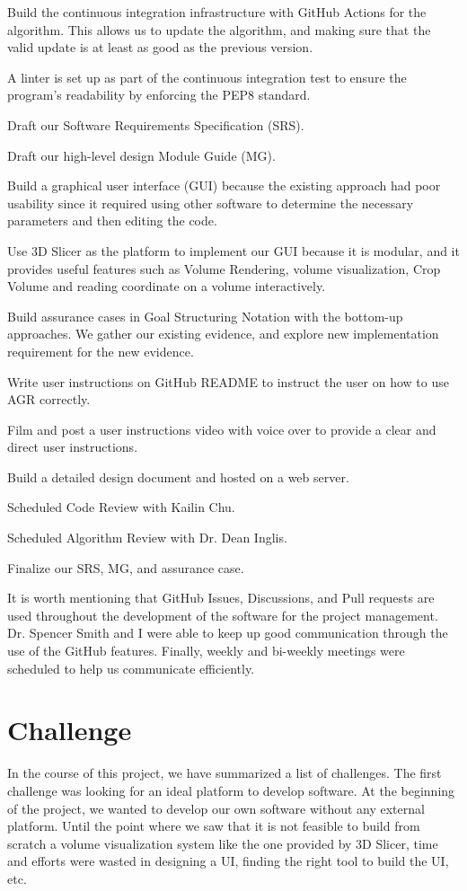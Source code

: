  \begin{myEnumerate}
\item Build the continuous integration infrastructure with GitHub Actions for the algorithm. This allows us to update the algorithm, and making sure that the valid update is at least as good as the previous version. 
\item A linter is set up as part of the continuous integration test to ensure the program's readability by enforcing the PEP8 standard.
\item Draft our Software Requirements Specification (SRS).
\item Draft our high-level design Module Guide (MG).
\item Build a graphical user interface (GUI) because the existing approach had poor usability since it required using other software to determine the necessary parameters and then editing the code.
\item Use 3D Slicer as the platform to implement our GUI because it is modular, and it provides useful features such as Volume Rendering, volume visualization, Crop Volume and reading coordinate on a volume interactively.
\item Build assurance cases in Goal Structuring Notation with the bottom-up approaches. We gather our existing evidence, and explore new implementation requirement for the new evidence.
\item Write user instructions on GitHub README to instruct the user on how to use AGR correctly.
\item Film and post a user instructions video with voice over to provide a clear and direct user instructions.
\item Build a detailed design document and hosted on a web server.
\item Scheduled Code Review with Kailin Chu.
\item Scheduled Algorithm Review with Dr. Dean Inglis.
\item Finalize our SRS, MG, and assurance case. 
\end{myEnumerate}

It is worth mentioning that GitHub Issues, Discussions, and Pull requests are used throughout the development of the software for the project management. Dr. Spencer Smith and I were able to keep up good communication through the use of the GitHub features. Finally, weekly and bi-weekly meetings were scheduled to help us communicate efficiently.

\section{Challenge}\label{challenge}
In the course of this project, we have summarized a list of challenges. The first challenge was looking for an ideal platform to develop \progname{} software. At the beginning of the project, we wanted to develop our own software without any external platform. Until the point where we saw that it is not feasible to build from scratch a volume visualization system like the one provided by 3D Slicer, time and efforts were wasted in designing a UI, finding the right tool to build the UI, etc. 

